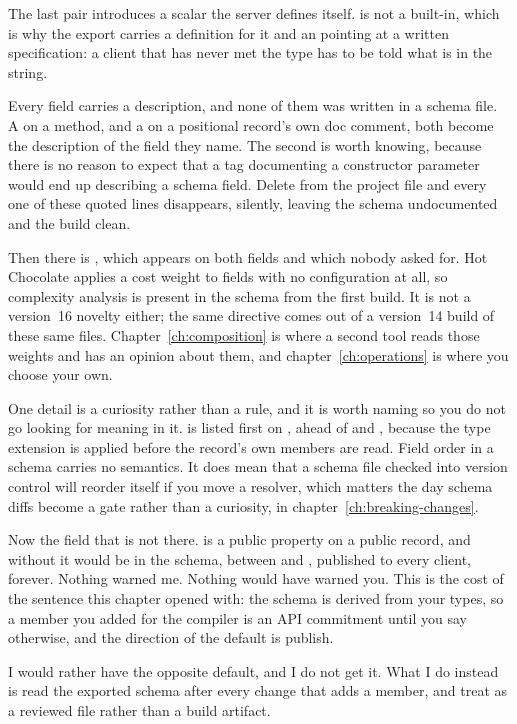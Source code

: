 The last pair introduces a scalar the server defines itself.  is
not a built-in, which is why the export carries a definition for it and an
 pointing at a written specification: a client that has
never met the type has to be told what is in the string.

%
Every field carries a description, and none of them was written in a schema
file. A  on a method, and a  on a positional
record's own doc comment, both become the description of the field they
name. The second is worth knowing, because there is no reason to expect
that a tag documenting a constructor parameter would end up describing a
schema field. Delete  from the project file
and every one of these quoted lines disappears, silently, leaving the
schema undocumented and the build clean.

%
Then there is , which appears on both fields and
which nobody asked for. Hot Chocolate applies a cost weight to fields with no
configuration at all, so complexity analysis is present in the schema from the
first build. It is not a version~16 novelty either; the same directive comes
out of a version~14 build of these same files. Chapter~\ref{ch:composition} is
where a second tool reads those weights and has an opinion about them, and
chapter~\ref{ch:operations} is where you choose your own.

%
One detail is a curiosity rather than a rule, and it is worth naming so you do
not go looking for meaning in it.  is listed first on
, ahead of  and , because the type extension
is applied before the record's own members are read. Field order in a schema
carries no semantics. It does mean that a schema file checked into version
control will reorder itself if you move a resolver, which matters the day
schema diffs become a gate rather than a curiosity, in
chapter~\ref{ch:breaking-changes}.

%
Now the field that is not there.  is a public property on a
public record, and without \code{[GraphQLIgnore]} it would be
 in the schema, between  and
, published to every client, forever. Nothing warned me. Nothing
would have warned you. This is the cost of the sentence this chapter opened
with: the schema is derived from your types, so a member you added for the
compiler is an API commitment until you say otherwise, and the direction of the
default is publish.

I would rather have the opposite default, and I do not get it. What I do
instead is read the exported schema after every change that adds a member, and
treat  as a reviewed file rather than a build artifact.
